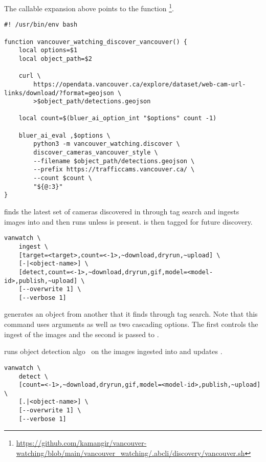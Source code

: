 %
The callable expansion above points to the function \footnote{\url{https://github.com/kamangir/vancouver-watching/blob/main/vancouver_watching/.abcli/discovery/vancouver.sh}}.
%
\begin{graybox}
\begin{verbatim}
#! /usr/bin/env bash

function vancouver_watching_discover_vancouver() {
    local options=$1
    local object_path=$2

    curl \
        https://opendata.vancouver.ca/explore/dataset/web-cam-url-links/download/?format=geojson \
        >$object_path/detections.geojson

    local count=$(bluer_ai_option_int "$options" count -1)

    bluer_ai_eval ,$options \
        python3 -m vancouver_watching.discover \
        discover_cameras_vancouver_style \
        --filename $object_path/detections.geojson \
        --prefix https://trafficcams.vancouver.ca/ \
        --count $count \
        "${@:3}"
}
\end{verbatim}
\end{graybox}

\marginpar{\keyword{ingest}}
 finds the latest set of cameras discovered in  through tag search and ingests  images into  and then runs  unless  is present.  is then tagged for future discovery. 
%
\begin{graybox}
\begin{verbatim}
vanwatch \
    ingest \
    [target=<target>,count=<-1>,~download,dryrun,~upload] \
    [-|<object-name>] \
    [detect,count=<-1>,~download,dryrun,gif,model=<model-id>,publish,~upload] \
    [--overwrite 1] \
    [--verbose 1]
\end{verbatim}
\end{graybox}
%
\keyword{vanwatch ingest} generates an object from another that it finds through tag search. Note that this command uses arguments as well as two cascading options. The first controls the ingest of the images and the second is passed to \keyword{detect}.

 runs object detection algo~\cite{ultralytics} on the images ingested into  and updates .
%
\begin{graybox}
\begin{verbatim}
vanwatch \
    detect \
    [count=<-1>,~download,dryrun,gif,model=<model-id>,publish,~upload] \
    [.|<object-name>] \
    [--overwrite 1] \
    [--verbose 1]
\end{verbatim}
\end{graybox}